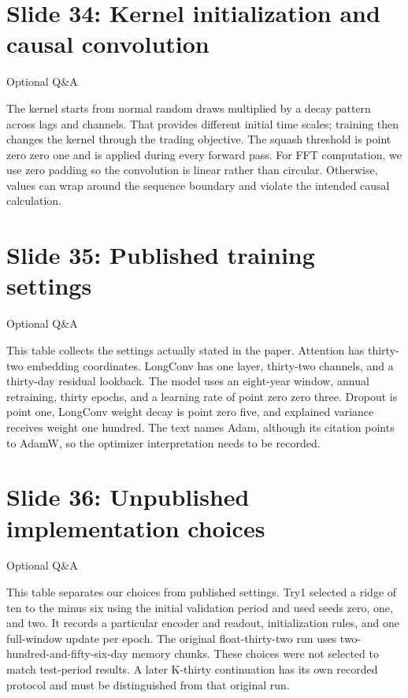 \documentclass[11pt]{article}
\begin{document}
\section*{Slide 34: Kernel initialization and causal convolution}

\textcolor{SBred}{Optional Q\&A}

The kernel starts from normal random draws multiplied by a decay pattern across lags and channels. That provides different initial time scales; training then changes the kernel through the trading objective. The squash threshold is point zero zero one and is applied during every forward pass. For FFT computation, we use zero padding so the convolution is linear rather than circular. Otherwise, values can wrap around the sequence boundary and violate the intended causal calculation.

\section*{Slide 35: Published training settings}

\textcolor{SBred}{Optional Q\&A}

This table collects the settings actually stated in the paper. Attention has thirty-two embedding coordinates. LongConv has one layer, thirty-two channels, and a thirty-day residual lookback. The model uses an eight-year window, annual retraining, thirty epochs, and a learning rate of point zero zero three. Dropout is point one, LongConv weight decay is point zero five, and explained variance receives weight one hundred. The text names Adam, although its citation points to AdamW, so the optimizer interpretation needs to be recorded.

\section*{Slide 36: Unpublished implementation choices}

\textcolor{SBred}{Optional Q\&A}

This table separates our choices from published settings. Try1 selected a ridge of ten to the minus six using the initial validation period and used seeds zero, one, and two. It records a particular encoder and readout, initialization rules, and one full-window update per epoch. The original float-thirty-two run uses two-hundred-and-fifty-six-day memory chunks. These choices were not selected to match test-period results. A later K-thirty continuation has its own recorded protocol and must be distinguished from that original run.
\end{document}
